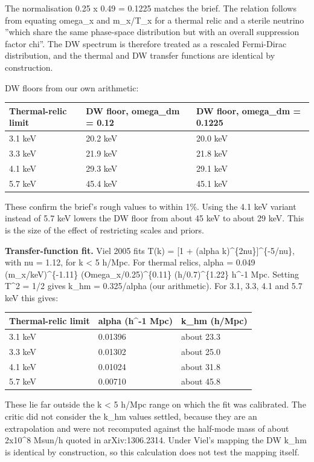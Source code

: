 \documentclass[11pt,a4paper]{article}
\begin{document}
The normalisation 0.25 x 0.49 = 0.1225 matches the brief. The relation follows from equating omega\_x and m\_x/T\_x for a thermal relic and a sterile neutrino ''which share the same phase-space distribution but with an overall suppression factor chi''. The DW spectrum is therefore treated as a rescaled Fermi-Dirac distribution, and the thermal and DW transfer functions are identical by construction.

DW floors from our own arithmetic:

\begin{longtable}{@{}p{}p{}p{}@{}}
\toprule
\textbf{Thermal-relic limit} & \textbf{DW floor, omega\_dm = 0.12} & \textbf{DW floor, omega\_dm = 0.1225} \\ \midrule \endhead
3.1 keV & 20.2 keV & 20.0 keV \\
3.3 keV & 21.9 keV & 21.8 keV \\
4.1 keV & 29.3 keV & 29.1 keV \\
5.7 keV & 45.4 keV & 45.1 keV \\
\bottomrule\end{longtable}
These confirm the brief's rough values to within 1\%. Using the 4.1 keV variant instead of 5.7 keV lowers the DW floor from about 45 keV to about 29 keV. This is the size of the effect of restricting scales and priors.

\textbf{Transfer-function fit.} Viel 2005 fits T(k) = [1 + (alpha k)\textasciicircum{}\{2nu\}]\textasciicircum{}\{-5/nu\}, with nu = 1.12, for k \textless{} 5 h/Mpc. For thermal relics, alpha = 0.049 (m\_x/keV)\textasciicircum{}\{-1.11\} (Omega\_x/0.25)\textasciicircum{}\{0.11\} (h/0.7)\textasciicircum{}\{1.22\} h\textasciicircum{}-1 Mpc. Setting T\textasciicircum{}2 = 1/2 gives k\_hm = 0.325/alpha (our arithmetic). For 3.1, 3.3, 4.1 and 5.7 keV this gives:

\begin{longtable}{@{}p{}p{}p{}@{}}
\toprule
\textbf{Thermal-relic limit} & \textbf{alpha (h\textasciicircum{}-1 Mpc)} & \textbf{k\_hm (h/Mpc)} \\ \midrule \endhead
3.1 keV & 0.01396 & about 23.3 \\
3.3 keV & 0.01302 & about 25.0 \\
4.1 keV & 0.01024 & about 31.8 \\
5.7 keV & 0.00710 & about 45.8 \\
\bottomrule\end{longtable}
These lie far outside the k \textless{} 5 h/Mpc range on which the fit was calibrated. The critic did not consider the k\_hm values settled, because they are an extrapolation and were not recomputed against the half-mode mass of about 2x10\textasciicircum{}8 Msun/h quoted in arXiv:1306.2314. Under Viel's mapping the DW k\_hm is identical by construction, so this calculation does not test the mapping itself.
\end{document}
